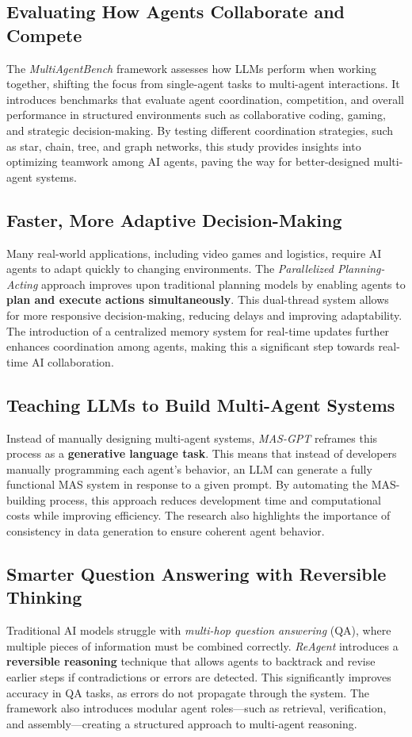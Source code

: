 \documentclass[a4paper,12pt]{article}
\begin{document}
\subsection{Evaluating How Agents Collaborate and Compete}  
The \textit{MultiAgentBench} framework assesses how LLMs perform when working together, shifting the focus from single-agent tasks to multi-agent interactions. It introduces benchmarks that evaluate agent coordination, competition, and overall performance in structured environments such as collaborative coding, gaming, and strategic decision-making. By testing different coordination strategies, such as star, chain, tree, and graph networks, this study provides insights into optimizing teamwork among AI agents, paving the way for better-designed multi-agent systems.

\subsection{Faster, More Adaptive Decision-Making}  
Many real-world applications, including video games and logistics, require AI agents to adapt quickly to changing environments. The \textit{Parallelized Planning-Acting} approach improves upon traditional planning models by enabling agents to \textbf{plan and execute actions simultaneously}. This dual-thread system allows for more responsive decision-making, reducing delays and improving adaptability. The introduction of a centralized memory system for real-time updates further enhances coordination among agents, making this a significant step towards real-time AI collaboration.

\subsection{Teaching LLMs to Build Multi-Agent Systems}  
Instead of manually designing multi-agent systems, \textit{MAS-GPT} reframes this process as a \textbf{generative language task}. This means that instead of developers manually programming each agent’s behavior, an LLM can generate a fully functional MAS system in response to a given prompt. By automating the MAS-building process, this approach reduces development time and computational costs while improving efficiency. The research also highlights the importance of consistency in data generation to ensure coherent agent behavior.

\subsection{Smarter Question Answering with Reversible Thinking}  
Traditional AI models struggle with \textit{multi-hop question answering} (QA), where multiple pieces of information must be combined correctly. \textit{ReAgent} introduces a \textbf{reversible reasoning} technique that allows agents to backtrack and revise earlier steps if contradictions or errors are detected. This significantly improves accuracy in QA tasks, as errors do not propagate through the system. The framework also introduces modular agent roles—such as retrieval, verification, and assembly—creating a structured approach to multi-agent reasoning.
\end{document}
